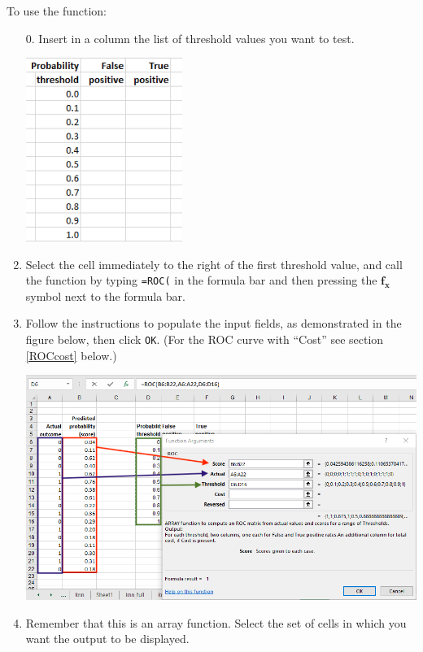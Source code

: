 \documentclass[12pt]{article}
\begin{document}
To use the function:
\begin{enumerate}

\item[0.] Insert in a column the list of threshold values you want to test.

\medskip

\centerline{\includegraphics[width=2in]{figures/roc1.png}}

\medskip

\item Select the cell immediately to the right of the first threshold value, and call the function by typing \texttt{=ROC(} in the formula bar and then pressing the $\boldsymbol{f_x}$ symbol next to the formula bar.

\item Follow the instructions to populate the input fields, as demonstrated in the figure below, then click \texttt{OK}. (For the ROC curve with ``Cost'' see section \ref{ROCcost} below.)

\medskip

\centerline{\includegraphics[width=5.5in]{figures/roc2.png}}

\medskip

\item Remember that this is an array function. Select the set of cells in which you want the output to be displayed.


\end{enumerate}
\end{document}

